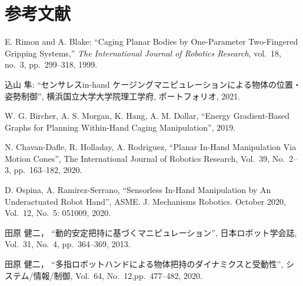 \documentclass[a4paper,twoside,12pt,papersize, dvipdfmx]{iirthesis}
\begin{document}
    \newcommand{\figref}[1]{\figurename\ref{#1}}
    \newcommand{\tabref}[1]{\tablename\ref{#1}}
    \renewcommand{\eqref}[1]{式~(\ref{#1})}
    \newcommand{\chapref}[1]{\ref{#1}章}
    \newcommand{\secref}[1]{\ref{#1}節}
    \newcommand{\ssecref}[1]{\ref{#1}項}
    \newcommand{\appref}[1]{付録\ref{#1}}
\fi

\chapter{参考文献}\label{chap:bibliography}

\begin{thebibliography}{}
E. Rimon and A. Blake:
``Caging Planar Bodies by One-Parameter Two-Fingered Gripping Systems,''
{\it The International Journal of Robotics Research}, vol.~18, no.~3, pp.~299--318, 1999.

込山 隼:
``センサレスin-hand ケージングマニピュレーションによる物体の位置・姿勢制御'',
横浜国立大学大学院理工学府, ポートフォリオ, 2021.
  


	W. G. Bircher, A. S. Morgan, K. Hang, A. M. Dollar,
  	``Energy Gradient-Based Graphs for Planning Within-Hand Caging Manipulation'',
  	2019.
    
 	N. Chavan-Dafle, R. Holladay, A. Rodriguez,
  	``Planar In-Hand Manipulation Via Motion Cones'',
  	 The International Journal of Robotics Research,
  	 Vol.~39, No.~2--3, pp.~163--182,
  	2020.
  	
	D. Ospina, A. Ramirez-Serrano,
  	``Sensorless In-Hand Manipulation by An Underactuated Robot Hand'',
  	 ASME. J. Mechanisms Robotics. October 2020,
  	 Vol.~12, No.~5: 051009, 
  	2020.

	田原 健二，
  	``動的安定把持に基づくマニピュレーション'',
  	 日本ロボット学会誌,
  	 Vol.~31, No.~4, pp.~364--369,
  	2013.  	

    	田原 健二，
  	``多指ロボットハンドによる物体把持のダイナミクスと受動性'',
  	 システム/情報/制御,
  	 Vol.~64, No.~12,pp.~477--482,
  	2020. 
  	

\end{thebibliography}
\end{document}
